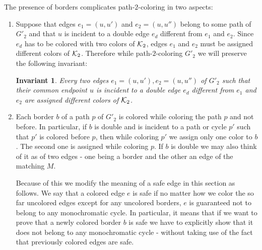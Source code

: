 \documentclass[a4, 11pt]{article}
\newcommand{\<}{\langle}
\renewcommand{\>}{\rangle}
\newcommand{\Kd}{{\cal K}_2}
\newtheorem{invariant}{Invariant}
\begin{document}
The presence of borders complicates path-$2$-coloring in two aspects:
\begin{enumerate}
\item Suppose that edges $e_1=(u,u')$ and $e_2=(u,u'')$ belong to some path of $G'_2$ and that $u$ is incident to a double edge $e_d$ different from $e_1$ and $e_2$.
Since $e_d$ has to be colored with two colors of $\Kd$, edges $e_1$ and $e_2$ must be assigned different colors of $\Kd$. Therefore while path-$2$-coloring $G'_2$ we will preserve the following invariant:
\begin{invariant}\label{invdouble}
Every two edges $e_1=(u,u'), e_2=(u,u'')$ of $G'_2$ such that their common endpoint $u$ is incident to a double edge $e_d$ different from $e_1$ and $e_2$ are assigned different colors of $\Kd$. 
\end{invariant}

\item Each border $b$ of a path $p$ of $G'_2$ is colored while coloring the path $p$ and not before. In particular, if $b$ is double and is incident to a path or cycle $p'$ such that $p'$ is colored before $p$, then while coloring $p'$ we assign only one color to $b$. The second one is assigned while coloring $p$.
If $b$ is double we may also think of it as of two edges - one being a border and the other an edge of the matching $M$.

Because of this we modify the meaning of a safe edge in this section as follows. We say that a colored edge $e$ is safe if no matter how we color the so far uncolored edges except for any uncolored borders, $e$ is guaranteed not to belong to any monochromatic cycle. In particular, it means that if we want to prove that a newly colored border $b$ is safe we have to explicitly show that it does not belong to any monochromatic cycle - without taking use of the fact that previously colored 
edges are safe.

\end{enumerate}
\end{document}
